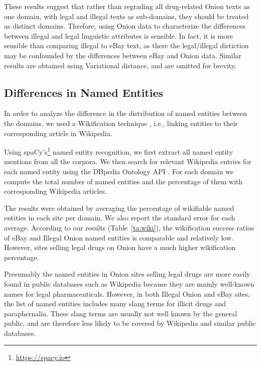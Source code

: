 \documentclass[11pt,a4paper,table]{article}
\newcommand{\oa}[1]{\footnote{\color{red}OA: #1}}
\begin{document}
    These results suggest that rather than regrading all drug-related Onion texts as one domain, with legal and illegal texts as sub-domains, 
      they should be treated as distinct domains.
    Threfore, using Onion data to characterize the differences between illegal and legal linguistic attributes is sensible. 
    In fact, it is more sensible than comparing illegal to eBay text, as there the legal/illegal distiction may be confounded by the differences
      between eBay and Onion data.
    Similar results are obtained using Variational distance, and are omitted for brevity.


\subsection{Differences in Named Entities}

    In order to analyze the difference in the distribution of 
    named entities between the domains,  we used a Wikification technique \cite{bunescu2006using}, i.e., linking entities to their corresponding article in Wikipedia.

    Using spaCy's\footnote{\url{https://spacy.io}}
    named entity recognition, we first extract all named
    entity mentions from all the corpora. 
    We then search for relevant Wikipedia entries for each named entity using the DBpedia Ontology API \cite{isem2013daiber}.
    For each domain we compute the total number of named entities and the percentage of them with corresponding Wikipedia articles.

    The results were obtained by averaging the percentage of wikifiable named entities in each site per domain. We also report the standard error for each average.
    According to our results (Table~\ref{ta:wiki}), the wikification success ratios of eBay and Illegal Onion named entities is comparable and relatively low. However, sites selling legal drugs on Onion have a much higher wikification percentage.

Presumably the named entities in Onion sites selling legal drugs are
more easily found in public databases such as Wikipedia because they
are mainly well-known names for legal pharmaceuticals. However, in
both Illegal Onion and eBay sites, the list of named entities includes
many slang terms for illicit drugs and paraphernalia. These slang terms
are usually not well known by the general public, and are therefore
less likely to be covered by Wikipedia and similar public databases.
\end{document}
